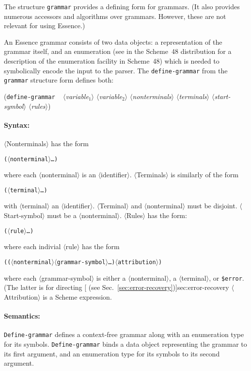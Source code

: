 \documentclass{article}
\newcommand{\meta}[1]{{\noindent\mbox{\textrm{$\langle$#1$\rangle$}}}}
\newcommand{\pproto}[2]{\unskip%
\mbox{\texonly{\spaceskip=0.5em}#1}%
\mbox{ }\texonly{\nobreak}\htmlonly{ }\textrm{#2}}
\newcommand{\proto}[3]{\par\bigskip\begin{flushleft}\pproto{(\texttt{#1}}{\textit{#2})}\hspace*{\fill}{#3}\end{flushleft}}
\newcommand{\dotsfoo}{\ldots\texonly{\thinspace}}
\newcommand{\codefont}[1]{\texttt{#1}}
\begin{document}
The structure \codefont{grammar} provides a defining form for
grammars.  (It also provides numerous accessors and algorithms over
grammars.  However, these are not relevant for using Essence.)

An Essence grammar consists of two data objects: a representation of
the grammar itself, and an enumeration (see 
in the Scheme~48 distribution for a description of the enumeration
facility in Scheme~48) which is needed to symbolically encode the
input to the parser.  The \codefont{define-grammar} from the
\codefont{grammar} structure form defines both:

\label{form:define-grammar}
\proto{define-grammar}{ \meta{variable$_1$} \meta{variable$_2$}\hfill\linebreak\texonly{\hspace*{1em}}
    \meta{nonterminals} \meta{terminals}
  \meta{start-symbol} \meta{rules}}{syntax}

\paragraph{Syntax:} \meta{Nonterminals} has the
form
%
\begin{alltt}
  (\meta{nonterminal} \dotsfoo)
\end{alltt}
%
where each \meta{nonterminal} is an \meta{identifier}.  \meta{Terminals} is
similarly of the form
%
\begin{alltt}
  (\meta{terminal} \dotsfoo)
\end{alltt}
%
with \meta{terminal} an \meta{identifier}.  \meta{Terminal} and
\meta{nonterminal} must be disjoint.  \meta{Start-symbol} must
be a \meta{nonterminal}.  \meta{Rules} has the form:
%
\begin{alltt}
  (\meta{rule} \dotsfoo)
\end{alltt}
%
where each indivial \meta{rule} has the form
%
\begin{alltt}
  ((\meta{nonterminal} \meta{grammar-symbol} \dotsfoo) \meta{attribution})
\end{alltt}
%
where each \meta{grammar-symbol} is either a \meta{nonterminal}, a
\meta{terminal}, or \codefont{\$error}.  (The latter is for directing
[ (see
Sec.~\ref{sec:error-recovery})]{sec:error-recovery} \meta{Attribution}
is a Scheme expression.

\paragraph{Semantics:} \codefont{Define-grammar} defines a
context-free grammar along with an enumeration type for its symbols.
\codefont{Define-grammar} binds a data object representing the grammar 
to its first argument, and an enumeration type for its symbols to its
second argument.
\end{document}
